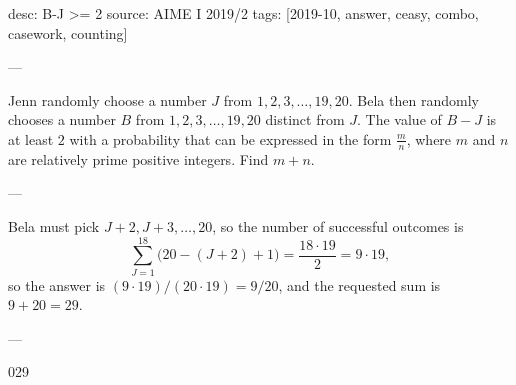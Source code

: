 desc: B-J >= 2
source: AIME I 2019/2
tags: [2019-10, answer, ceasy, combo, casework, counting]

---

Jenn randomly choose a number $J$ from $1,2,3,\ldots,19,20$. Bela then randomly chooses a number $B$ from $1,2,3,\ldots,19,20$ distinct from $J$. The value of $B-J$ is at least $2$ with a probability that can be expressed in the form $\tfrac mn$, where $m$ and $n$ are relatively prime positive integers. Find $m+n$.

---

Bela must pick $J+2,J+3,\ldots,20$, so the number of successful outcomes is \[\sum_{J=1}^{18}\big(20-(J+2)+1\big)=\frac{18\cdot 19}2=9\cdot 19,\]
so the answer is $(9\cdot 19)/(20\cdot 19)=9/20$, and the requested sum is $9+20=29$.

---

029
